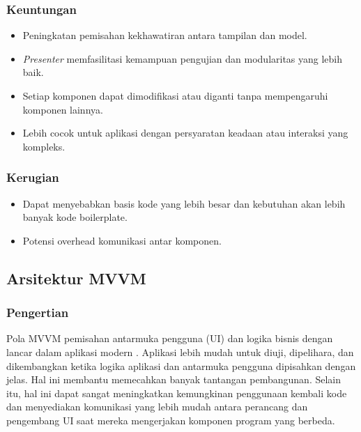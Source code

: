 \documentclass[conference]{IEEEtran}
\begin{document}
	\subsubsection{Keuntungan}
	\begin{itemize}
		\item Peningkatan pemisahan kekhawatiran antara tampilan dan model.
		\item \textit{Presenter} memfasilitasi kemampuan pengujian dan modularitas yang lebih baik.
		\item Setiap komponen dapat dimodifikasi atau diganti tanpa mempengaruhi komponen lainnya.
		\item Lebih cocok untuk aplikasi dengan persyaratan keadaan atau interaksi yang kompleks.
	\end{itemize}
	
	\subsubsection{Kerugian}
	\begin{itemize}
		\item Dapat menyebabkan basis kode yang lebih besar dan kebutuhan akan lebih banyak kode boilerplate.
		\item Potensi overhead komunikasi antar komponen.
	\end{itemize}
	
	\subsection{Arsitektur MVVM}
	\subsubsection{Pengertian}
	Pola MVVM pemisahan antarmuka pengguna (UI) dan logika bisnis dengan lancar dalam aplikasi modern \cite{Kom2022, Car2022}. Aplikasi lebih mudah untuk diuji, dipelihara, dan dikembangkan ketika logika aplikasi dan antarmuka pengguna dipisahkan dengan jelas. Hal ini membantu memecahkan banyak tantangan pembangunan. Selain itu, hal ini dapat sangat meningkatkan kemungkinan penggunaan kembali kode dan menyediakan komunikasi yang lebih mudah antara perancang dan pengembang UI saat mereka mengerjakan komponen program yang berbeda. 
	
\end{document}
